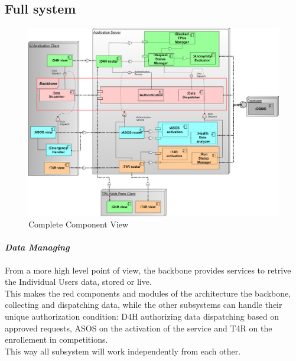 \subsection{Full system}
\begin{figure}[H]
\label{fig:ComponentDiagram}
\caption{Complete Component View}
\centering
\includegraphics[width = \textwidth]{sections/architecturalDesign/ComponentDiagram.png}
\end{figure}
\paragraph{\textit{Data Managing}} From a more high level point of view, the backbone provides services to retrive the Individual Users data, stored or live. \\
This makes the red components and modules of the architecture the backbone, collecting and dispatching data, while the other subsystems can handle their unique authorization condition: D4H authorizing data dispatching based on approved requests, ASOS on the activation of the service and T4R on the enrollement in competitions. \\
This way all subsystem will work independently from each other.%
\clearpage
